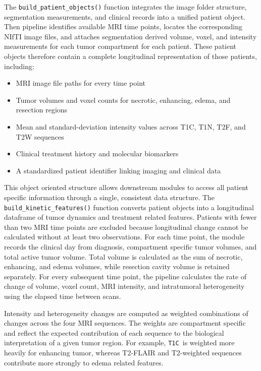 The \texttt{build\_patient\_objects()} function integrates the image folder structure, segmentation measurements, and clinical records into a unified patient object. Then pipeline identifies available MRI time points, locates the corresponding NIfTI image files, and attaches segmentation derived volume, voxel, and intensity measurements for each tumor compartment for each patient. These patient objects therefore contain a complete longitudinal representation of those patients, including:

\begin{itemize}
    \item MRI image file paths for every time point
    \item Tumor volumes and voxel counts for necrotic, enhancing, edema, and resection regions
    \item Mean and standard-deviation intensity values across T1C, T1N, T2F, and T2W sequences
    \item Clinical treatment history and molecular biomarkers
    \item A standardized patient identifier linking imaging and clinical data
\end{itemize}

This object oriented structure allows downstream modules to access all patient specific information through a single, consistent data structure. The \texttt{build\_kinetic\_features()} function converts patient objects into a longitudinal dataframe of tumor dynamics and treatment related features. Patients with fewer than two MRI time points are excluded because longitudinal change cannot be calculated without at least two observations. For each time point, the module records the clinical day from diagnosis, compartment specific tumor volumes, and total active tumor volume. Total volume is calculated as the sum of necrotic, enhancing, and edema volumes, while resection cavity volume is retained separately. For every subsequent time point, the pipeline calculates the rate of change of volume, voxel count, MRI intensity, and intratumoral heterogeneity using the elapsed time between scans.

Intensity and heterogeneity changes are computed as weighted combinations of changes across the four MRI sequences. The weights are compartment specific and reflect the expected contribution of each sequence to the biological interpretation of a given tumor region. For example, \texttt{T1C }is weighted more heavily for enhancing tumor, whereas T2-FLAIR and T2-weighted sequences contribute more strongly to edema related features\cite{fan2024radiomics}.

